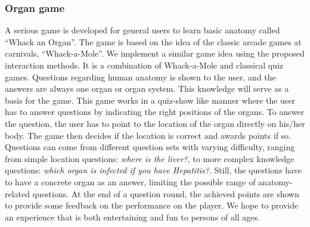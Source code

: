 
\subsubsection{Organ game}
A serious game is developed for general users to learn basic anatomy called ``Whack an Organ''. The game is based on the idea of the classic arcade games at carnivals, ``Whack-a-Mole''. We implement a similar game idea using the proposed interaction methods. It is a combination of Whack-a-Mole and classical quiz games. Questions regarding human anatomy is shown to the user, and the answers are always one organ or organ system. 
This knowledge will serve as a basis for the game. This game works in a quiz-show like manner where the user has to answer questions by indicating the right positions of the organs.
To answer the question, the user has to point to the location of the organ directly on his/her body. 
The game then decides if the location is correct and awards points if so. Questions can come from different question sets with varying difficulty, ranging from simple location questions: \textit{where is the liver?}, to more complex knowledge questions: \textit{which organ is infected if you have Hepatitis?}.
Still, the questions have to have a concrete organ as an answer, limiting the possible range of anatomy-related questions. At the end of a question round, the achieved points are shown to provide some feedback on the performance on the player.
We hope to provide an experience that is both entertaining and fun to persons of all ages.

